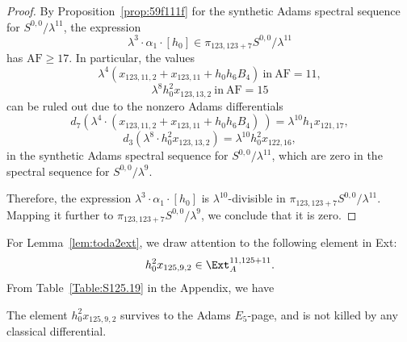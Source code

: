 \documentclass{amsart}
\numberwithin{equation}{section}
\newcommand{\AF}{\mathrm{AF}}
\begin{document}
\begin{proof}
By Proposition~\ref{prop:59f111f} for the synthetic Adams spectral sequence for $S^{0,0}/\lambda^{11}$, the expression 
$$\lambda^3 \cdot \alpha_1 \cdot [h_0] \in  \pi_{123,123+7} S^{0,0}/\lambda^{11}$$
has $\AF \ge 17$. %
In particular, the values $$\lambda^4(x_{123,11,2}+x_{123,11}+h_0h_6B_4) \ \text{in} \ \AF=11,$$ 
$$\lambda^8 h_0^2x_{123,13,2} \ \text{in} \ \AF=15$$
can be ruled out due to the nonzero Adams differentials
$$d_7( \lambda^4 \cdot (x_{123,11,2}+x_{123,11}+h_0h_6B_4) \ ) = \lambda^{10} h_1x_{121,17},$$
$$d_3 (\lambda^8 \cdot h_0^2x_{123,13,2}) = \lambda^{10} h_0^2 x_{122,16},$$
in the synthetic Adams spectral sequence for $S^{0,0}/\lambda^{11}$, which are zero in the spectral sequence for $S^{0,0}/\lambda^{9}$.

Therefore, the expression $\lambda^3 \cdot \alpha_1 \cdot [h_0]$ is $\lambda^{10}$-divisible in $\pi_{123,123+7} S^{0,0}/\lambda^{11}$. Mapping it further to $\pi_{123,123+7} S^{0,0}/\lambda^9$, we conclude that it is zero. 
\end{proof}







For Lemma~\ref{lem:toda2ext}, we draw attention to the following element in Ext:
$$h_0^2x_{125,9,2} \in \Ext_A^{11, 125+11}.$$
From Table~\ref{Table:S125.19} in the Appendix, we have
\begin{fact} \label{fact:h_0_sq_mul_x_125_9_2}\label{fact:h02x1259}
    The element $h_0^2x_{125,9,2}$ survives to the Adams $E_5$-page, and is not killed by any classical differential.
\end{fact}
\end{document}
